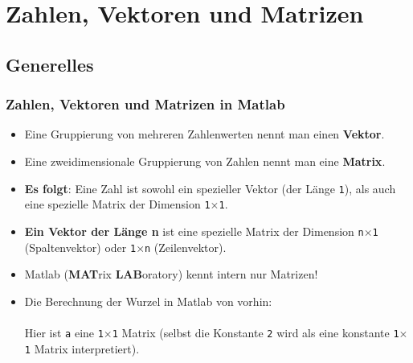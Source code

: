     \section{Zahlen, Vektoren und Matrizen}

    \subsection{Generelles}
    \begin{frame}
      \frametitle{Zahlen, Vektoren und Matrizen in Matlab}
      \begin{itemize}
          \item Eine Gruppierung von mehreren Zahlenwerten nennt man einen \textbf{Vektor}.
          \item Eine zweidimensionale Gruppierung von Zahlen nennt man eine \textbf{Matrix}.
          \item \textbf{Es folgt}: Eine Zahl ist sowohl ein spezieller Vektor (der Länge \texttt{1}), als auch eine spezielle Matrix der Dimension \texttt{1$\times$1}.
          \item \textbf{Ein Vektor der Länge n} ist eine spezielle Matrix der Dimension \texttt{n$\times$1} (Spaltenvektor) oder \texttt{1$\times$n} (Zeilenvektor).
          \item Matlab (\textbf{MAT}rix \textbf{LAB}oratory) kennt intern nur Matrizen!
          \item Die Berechnung der Wurzel in Matlab von vorhin: \\
           \\
          Hier ist \texttt{a} eine \texttt{1$\times$1} Matrix (selbst die Konstante \texttt{2} wird als eine konstante \texttt{1$\times$1} Matrix interpretiert).
      \end{itemize}
    \end{frame}

